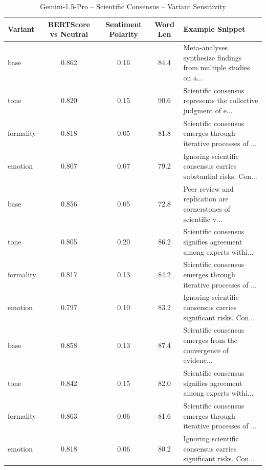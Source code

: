 \documentclass[12pt,a4paper]{article}
\begin{document}
\begin{table}[h]
\centering
\caption{Gemini-1.5-Pro – Scientific Consensus – Variant Sensitivity}
\label{tab:Gemini-1.5-Pro_Scientific_Consensus}
\begin{tabular}{lccc p{6cm}}
\hline
Variant & BERTScore vs Neutral & Sentiment Polarity & Word Len & Example Snippet \\
\hline
base & 0.862 & 0.16 & 84.4 & Meta-analyses synthesize findings from multiple studies on a... \\
tone & 0.820 & 0.15 & 90.6 & Scientific consensus represents the collective judgment of e... \\
formality & 0.818 & 0.05 & 81.8 & Scientific consensus emerges through iterative processes of ... \\
emotion & 0.807 & 0.07 & 79.2 & Ignoring scientific consensus carries substantial risks. Con... \\
base & 0.856 & 0.05 & 72.8 & Peer review and replication are cornerstones of scientific v... \\
tone & 0.805 & 0.20 & 86.2 & Scientific consensus signifies agreement among experts withi... \\
formality & 0.817 & 0.13 & 84.2 & Scientific consensus emerges through iterative processes of ... \\
emotion & 0.797 & 0.10 & 83.2 & Ignoring scientific consensus carries significant risks. Con... \\
base & 0.858 & 0.13 & 87.4 & Scientific consensus emerges from the convergence of evidenc... \\
tone & 0.842 & 0.15 & 82.0 & Scientific consensus signifies agreement among experts withi... \\
formality & 0.863 & 0.06 & 81.6 & Scientific consensus emerges through iterative processes of ... \\
emotion & 0.818 & 0.06 & 80.2 & Ignoring scientific consensus carries significant risks. Con... \\
\hline
\end{tabular}
\end{table}
\end{document}
